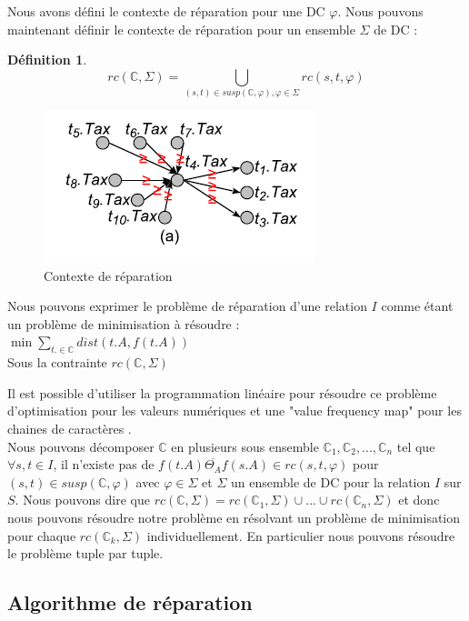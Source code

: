 \documentclass[letterpaper, 12pt]{report}
\theoremstyle{definition}
\newtheorem{mydef}{Définition}
\newcommand{\C}{\mathbb{C}}
\begin{document}
Nous avons défini le contexte de réparation pour une DC $\varphi$. Nous pouvons maintenant définir le contexte de réparation pour un ensemble $\Sigma$ de DC : 
\begin{mydef}
	$$rc(\mathbb{C},\Sigma) = \bigcup_{(s,t) \in susp(\mathbb{C},\varphi), \varphi \in  \Sigma} rc(s,t,\varphi)$$
\end{mydef}

\begin{figure}
\centering
\includegraphics[scale=1]{img/context.png}
\caption{\label{context} Contexte de réparation}
\end{figure}

Nous pouvons exprimer le problème de réparation d'une relation $I$ comme étant un problème de minimisation à résoudre : \\

$\min \sum_{t. \in \mathbb{C}} dist(t.A,f(t.A))$ \\
Sous la contrainte $ rc(\mathbb{C} , \Sigma)$

Il est possible d'utiliser la programmation linéaire pour résoudre ce problème d'optimisation pour les valeurs numériques et une "value frequency map" pour les chaines de caractères \cite{main}.\\

Nous pouvons décomposer $\C$ en plusieurs sous ensemble $\C_1 , \C_2,...,\C_n$ tel que $\forall s,t \in I$, il n'existe pas de $f(t.A) \overline{\Theta_A} f(s.A) \in rc(s,t,\varphi)$ pour $(s,t) \in susp(\C,\varphi)$ avec $\varphi \in \Sigma$ et $\Sigma$ un ensemble de DC pour la relation $I$ sur $S$. Nous pouvons dire que $rc(\C,\Sigma) = rc(\C_1,\Sigma) \cup ... \cup rc(\C_n,\Sigma) $ et donc nous pouvons résoudre notre problème en résolvant un problème de minimisation pour chaque $rc(\C_k , \Sigma)$ individuellement. En particulier nous pouvons résoudre le problème tuple par tuple.\\

\subsection{Algorithme de réparation}
\end{document}
